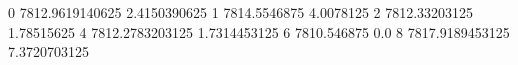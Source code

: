 0 7812.9619140625 2.4150390625
1 7814.5546875 4.0078125
2 7812.33203125 1.78515625
4 7812.2783203125 1.7314453125
6 7810.546875 0.0
8 7817.9189453125 7.3720703125
